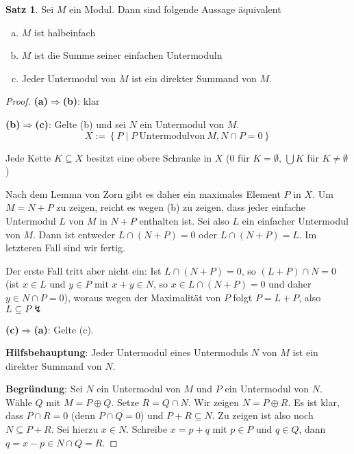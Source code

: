 \documentclass[
twoside=semi,
fontsize=12,
DIV=12, 
cleardoublepage=current,
leqno,
headings=optiontoheadandtoc, 
toc=idx
]{scrbook}
\newcommand{\set}[1]{\left\{ #1 \right\}}
\theoremstyle{definition}
\newtheorem{satz}[definition]{Satz}
\begin{document}
	\begin{satz}\label{1.3.10}\hfill\newline
		Sei $M$ ein Modul. Dann sind folgende Aussage \"aquivalent
		\begin{enumerate}[(a)]
			\item $M$ ist halbeinfach
			
			\item $M$ ist die Summe seiner einfachen Untermoduln
			
			\item Jeder Untermodul von $M$ ist ein direkter Summand von $M$.
		\end{enumerate}	
		
		\begin{proof}\hfill\newline
			\textbf{(a)$\Longrightarrow$(b)}: klar
			
			\medskip\noindent
			\textbf{(b)$\Longrightarrow$(c)}: Gelte (b) und sei $N$ ein Untermodul von $M$.
				\[X:= \set{P \mid P \ \mathrm{Untermodul von }\ M, N \cap P = 0}\]
			
			\noindent Jede Kette $K \subseteq X$ besitzt eine obere Schranke in $X$ ($0$ f\"ur $K = \emptyset$, $\bigcup K$ f\"ur $K \neq \emptyset$)
			
			\noindent Nach dem Lemma von Zorn gibt es daher ein maximales Element $P$ in $X$. Um $M = N + P$ zu zeigen, reicht es wegen (b) zu zeigen, dass jeder einfache Untermodul $L$ von $M$ in $N + P$ enthalten ist. Sei also $L$ ein einfacher Untermodul von $M$. Dann ist entweder $L \cap (N + P) = 0$ oder $L \cap (N + P) = L$. Im letzteren Fall sind wir fertig.
			
			\noindent Der erste Fall tritt aber nicht ein:\newline
			Ist $L \cap (N+P) = 0$, so $(L+P)\cap N = 0$ (ist $x \in L$ und $y \in P$ mit $x+y \in N$, so $x \in L\cap (N+P) = 0$ und daher $y \in N\cap P = 0$), woraus wegen der Maximalit\"at von $P$ folgt $P = L + P$, also $L \subseteq P \lightning$
			
			\medskip\noindent 
			\textbf{(c)$\Longrightarrow$(a)}: Gelte (c).\newline
			{\color{red}
			\textbf{Hilfsbehauptung}: Jeder Untermodul eines Untermoduls $N$ von $M$ ist ein direkter Summand von $N$.
			
			\smallskip\noindent
			\textbf{Begr\"undung}: Sei $N$ ein Untermodul von $M$ und $P$ ein Untermodul von $N$.
			W\"ahle $Q$ mit $M = P \oplus Q$. Setze $R = Q \cap N$. Wir zeigen $N = P \oplus R$. Es ist klar, dass $P \cap R = 0$ (denn $P \cap Q = 0$) und $P + R \subseteq N$. Zu zeigen ist also noch $N \subseteq P + R$. \newline
			Sei hierzu $x \in N$. Schreibe $x = p + q$ mit $p \in P$ und $q \in Q$, dann $q = x - p \in N \cap Q = R$. } 
			

\end{proof}
\end{satz}
\end{document}
